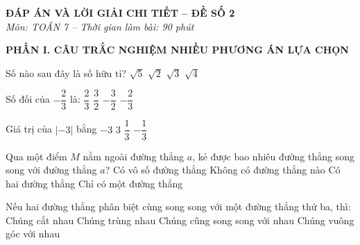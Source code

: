 \documentclass[12pt,a4paper]{article}
\begin{document}
\begin{center}
\textbf{\Large ĐÁP ÁN VÀ LỜI GIẢI CHI TIẾT -- ĐỀ SỐ 2}\\
\textit{Môn: TOÁN 7 -- Thời gian làm bài: 90 phút}
\end{center}
\vspace{2mm}

\noindent\textbf{\large PHẦN I. CÂU TRẮC NGHIỆM NHIỀU PHƯƠNG ÁN LỰA CHỌN}

\vspace{1mm}
\begin{ex}
Số nào sau đây là số hữu tỉ?
\choice
{$\sqrt{5}$}
{$\sqrt{2}$}
{$\sqrt{3}$}
{\True $\sqrt{4}$}
\end{ex}

\begin{ex}
Số đối của $-\dfrac{2}{3}$ là:
\choice
{\True $\dfrac{2}{3}$}
{$\dfrac{3}{2}$}
{$-\dfrac{3}{2}$}
{$-\dfrac{2}{3}$}
\end{ex}

\begin{ex}
Giá trị của $|-3|$ bằng
\choice
{$-3$}
{\True $3$}
{$\dfrac{1}{3}$}
{$-\dfrac{1}{3}$}
\end{ex}

\begin{ex}
Qua một điểm $M$ nằm ngoài đường thẳng $a$, kẻ được bao nhiêu đường thẳng song song với đường thẳng $a$?
\choice
{Có vô số đường thẳng}
{Không có đường thẳng nào}
{Có hai đường thẳng}
{\True Chỉ có một đường thẳng}
\end{ex}

\begin{ex}
Nếu hai đường thẳng phân biệt cùng song song với một đường thẳng thứ ba, thì:
\choice
{Chúng cắt nhau}
{Chúng trùng nhau}
{\True Chúng cũng song song với nhau}
{Chúng vuông góc với nhau}
\end{ex}
\end{document}
